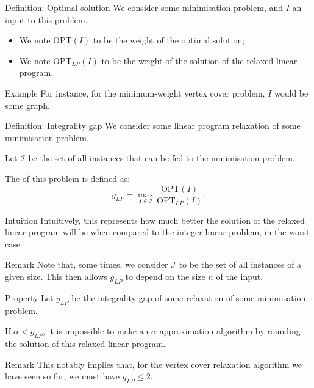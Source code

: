 \documentclass[a4paper]{article}
\begin{document}
\begin{parag}{Definition: Optimal solution}
    We consider some minimisation problem, and $I$ an input to this problem.

    \begin{itemize}
        \item We note $\text{OPT}\left(I\right)$ to be the weight of the optimal solution;
        \item We note $\text{OPT}_{LP}\left(I\right)$ to be the weight of the solution of the relaxed linear program.
    \end{itemize}

    \begin{subparag}{Example}
        For instance, for the minimum-weight vertex cover problem, $I$ would be some graph.
    \end{subparag}
\end{parag}


\begin{parag}{Definition: Integrality gap}
    We consider some linear program relaxation of some minimisation problem.

    Let $\mathcal{I}$ be the set of all instances that can be fed to the minimisation problem.

    The  of this problem is defined as: 
    \[g_{LP} = \max_{I \in \mathcal{I}} \frac{\text{OPT}\left(I\right)}{\text{OPT}_{LP}\left(I\right)}.\]

    \begin{subparag}{Intuition}
        Intuitively, this represents how much better the solution of the relaxed linear program will be when compared to the integer linear problem, in the worst case.
    \end{subparag}

    \begin{subparag}{Remark}
        Note that, some times, we consider $\mathcal{I}$ to be the set of all instances of a given size. This then allows $g_{LP}$ to depend on the size $n$ of the input.
    \end{subparag}
\end{parag}

\begin{parag}{Property}
    Let $g_{LP}$ be the integrality gap of some relaxation of some minimisation problem.

    If $\alpha < g_{LP}$, it is impossible to make an $\alpha$-approximation algorithm by rounding the solution of this relaxed linear program.

    \begin{subparag}{Remark}
        This notably implies that, for the vertex cover relaxation algorithm we have seen so far, we must have $g_{LP} \leq 2$.
    \end{subparag}
\end{parag}

 
\end{document}

